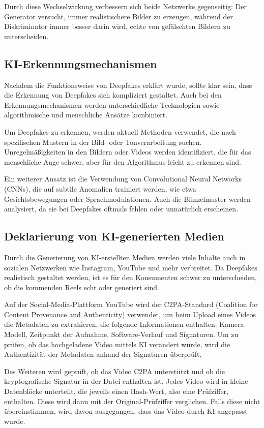 \documentclass[a4paper,12pt]{article}
\begin{document}
Durch diese Wechselwirkung verbessern sich beide Netzwerke gegenseitig: Der Generator versucht, immer realistischere Bilder zu erzeugen, 
während der Diskriminator immer besser darin wird, echte von gefälschten Bildern zu unterscheiden. \cite{BVDW2024}

\subsection{KI-Erkennungsmechanismen}\label{subsec:KI-Erkennungsmechanismen}
Nachdem die Funktionsweise von Deepfakes erklärt wurde, sollte klar sein, dass die Erkennung von Deepfakes sich kompliziert gestaltet. 
Auch bei den Erkennungsmechanismen werden unterschiedliche Technologien sowie algorithmische und menschliche Ansätze kombiniert.  

Um Deepfakes zu erkennen, werden aktuell Methoden verwendet, die nach spezifischen Mustern in der Bild- oder Tonverarbeitung suchen. 
Unregelmäßigkeiten in den Bildern oder Videos werden identifiziert, die für das menschliche Auge schwer, aber für den Algorithmus leicht zu erkennen sind.  

Ein weiterer Ansatz ist die Verwendung von Convolutional Neural Networks (CNNs), die auf subtile Anomalien trainiert werden, wie etwa Gesichtsbewegungen oder Sprachmodulationen. 
Auch die Blinzelmuster werden analysiert, da sie bei Deepfakes oftmals fehlen oder unnatürlich erscheinen. \cite{BVDW2024}

\subsection{Deklarierung von KI-generierten Medien}
Durch die Generierung von KI-erstellten Medien werden viele Inhalte auch in sozialen Netzwerken wie Instagram, YouTube und mehr verbreitet. 
Da Deepfakes realistisch gestaltet werden, ist es für den Konsumenten schwer zu unterscheiden, ob die kommenden Reels echt oder generiert sind.  

Auf der Social-Media-Plattform YouTube wird der C2PA-Standard (Coalition for Content Provenance and Authenticity) verwendet, 
um beim Upload eines Videos die Metadaten zu extrahieren, die folgende Informationen enthalten: Kamera-Modell, Zeitpunkt der Aufnahme, Software-Verlauf und Signaturen. 
Um zu prüfen, ob das hochgeladene Video mittels KI verändert wurde, wird die Authentizität der Metadaten anhand der Signaturen überprüft.  

Des Weiteren wird geprüft, ob das Video C2PA unterstützt und ob die kryptografische Signatur in der Datei enthalten ist. Jedes Video wird in kleine Datenblöcke unterteilt, die jeweils einen Hash-Wert, also eine Prüfziffer, enthalten. Diese wird dann mit der Original-Prüfziffer verglichen. Falls diese nicht übereinstimmen, wird davon ausgegangen, dass das Video durch KI angepasst wurde. \cite{TheVerge2024a}  
\end{document}
